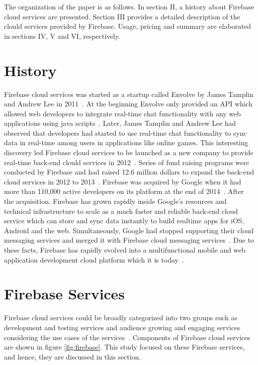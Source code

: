 The organization of the paper is as follows. In section II, a history about 
Firebase cloud services are presented. Section III provides a detailed 
description of the clould services provided by Firebase. Usage, pricing and 
summary are elaborated in sections IV, V and VI, respectively.

\section{History}

Firebase cloud services was started as a startup called Envolve by James 
Tamplin and Andrew Lee in 2011~\cite{hid-sp18-409-www-firebase-wikipedia}. At 
the beginning Envolve only provided an API which allowed web developers to 
integrate real-time chat functionality with any web applications using java 
scripts~\cite{hid-sp18-409-www-firebase}. Later, James Tamplin and Andrew Lee 
had observed that developers had started to use real-time chat functionality to 
sync data in real-time among users in applications like online games. This 
interesting discovery led Firebase cloud services to be launched as a new 
company to provide real-time back-end clould services in 
2012~\cite{hid-sp18-409-www-firebase-wikipedia}. Series of fund raising 
programs were conducted by Firebase and had raised 12.6 million dollars to 
expand the back-end cloud services in 2012 to 
2013~\cite{hid-sp18-409-www-firebase}. Firebase was acquired by Google when it 
had more than 110,000 active developers on its platform  at the end of 
2014~\cite{hid-sp18-409-www-firebase-acquired}. After the acquisition, Firebase 
has grown rapidly inside Google's resources and technical infrastructure to 
scale as a much faster and reliable back-end cloud service which can store and 
sync data instantly to build realtime apps for iOS, Android and the web. 
Simultaneously, Google had stopped supporting their cloud messaging services 
and merged it with Firebase cloud messaging 
services~\cite{hid-sp18-409-www-firebase-merged}. Due to these facts, Firebase 
has rapidly evolved into a multifunctional mobile and web application 
development cloud platform which it is 
today~\cite{hid-sp18-409-www-firebase-official}.

\section{Firebase Services}

Firebase cloud services could be broadly categorized into two groups such as 
development and testing services and audience growing and engaging services 
considering the use cases of the 
services~\cite{hid-sp18-409-www-firebase-products}. Components of Firebase 
cloud services are shown in figure \ref{fig:firebase}. This study focused on 
these Firebase services, and hence, they are discussed in this section. 


